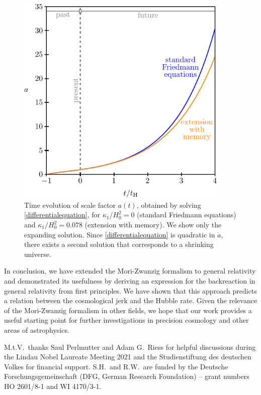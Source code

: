 \documentclass[aps,prl,11pt,nofootinbib]{revtex4-1}
\begin{document}
\begin{figure}
\centering
\includegraphics[width=4in]{fig1}
\caption{\label{fig:1}Time evolution of scale factor $a(t)$, obtained by solving \cref{differentialequation}, for $\kappa_1/H_0^2 = 0$ (standard Friedmann equations) and $\kappa_1/H_0^2 = 0.078$ (extension with memory). We show only the expanding solution. Since \cref{differentialequation} is quadratic in $\dot{a}$, there exists a second solution that corresponds to a shrinking universe.}
\end{figure} 

In conclusion, we have extended the Mori-Zwanzig formalism to general relativity and demonstrated its usefulness by deriving an expression for the backreaction in general relativity from first principles. We have shown that this approach predicts a relation between the cosmological jerk and the Hubble rate. Given the relevance of the Mori-Zwanzig formalism in other fields, we hope that our work provides a useful starting point for further investigations in precision cosmology and other areas of astrophysics. 

\acknowledgments
M.t.V.\ thanks Saul Perlmutter and Adam G.\ Riess for helpful discussions during the Lindau Nobel Laureate Meeting 2021 and the Studienstiftung des deutschen Volkes for financial support. 
S.H.\ and R.W.\ are funded by the Deutsche Forschungsgemeinschaft (DFG, German Research Foundation) -- grant numbers HO 2601/8-1 and WI 4170/3-1.


\newpage
\nocite{apsrev41Control}


\end{document}
